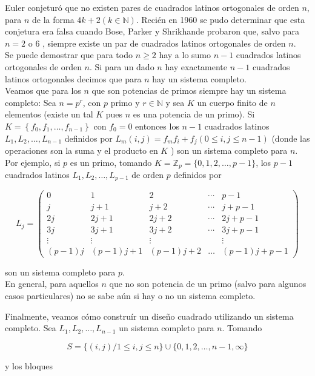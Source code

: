 \documentclass[10pt]{article}
\begin{document}
Euler conjeturó que no existen pares de cuadrados latinos ortogonales de orden $n$, para $n$ de la forma $4 k+2(k \in \mathbb{N})$. Recién en 1960 se pudo determinar que esta conjetura era falsa cuando Bose, Parker y Shrikhande probaron que, salvo para $n=2$ o 6 , siempre existe un par de cuadrados latinos ortogonales de orden $n$.\\
Se puede demostrar que para todo $n \geq 2$ hay a lo sumo $n-1$ cuadrados latinos ortogonales de orden $n$. Si para un dado $n$ hay exactamente $n-1$ cuadrados latinos ortogonales decimos que para $n$ hay un sistema completo.\\
Veamos que para los $n$ que son potencias de primos siempre hay un sistema completo: Sea $n=p^{r}$, con $p$ primo y $r \in \mathbb{N}$ y sea $K$ un cuerpo finito de $n$ elementos (existe un tal $K$ pues $n$ es una potencia de un primo). Si $K=\left\{f_{0}, f_{1}, \ldots, f_{n-1}\right\}$ con $f_{0}=0$ entonces los $n-1$ cuadrados latinos $L_{1}, L_{2}, \ldots, L_{n-1}$ definidos por $L_{m}(i, j)=f_{m} f_{i}+f_{j}(0 \leq i, j \leq n-1)$ (donde las operaciones son la suma y el producto en $K$ ) son un sistema completo para $n$. Por ejemplo, si $p$ es un primo, tomando $K=\mathbb{Z}_{p}=\{0,1,2, \ldots, p-1\}$, los $p-1$ cuadrados latinos $L_{1}, L_{2}, \ldots, L_{p-1}$ de orden $p$ definidos por

$$
L_{j}=\left(\begin{array}{ccccc}
0 & 1 & 2 & \cdots & p-1 \\
j & j+1 & j+2 & \cdots & j+p-1 \\
2 j & 2 j+1 & 2 j+2 & \cdots & 2 j+p-1 \\
3 j & 3 j+1 & 3 j+2 & \cdots & 3 j+p-1 \\
\vdots & \vdots & \vdots & & \vdots \\
(p-1) j & (p-1) j+1 & (p-1) j+2 & \ldots & (p-1) j+p-1
\end{array}\right)
$$

son un sistema completo para $p$.\\
En general, para aquellos $n$ que no son potencia de un primo (salvo para algunos casos particulares) no se sabe aún si hay o no un sistema completo.

Finalmente, veamos cómo construír un diseño cuadrado utilizando un sistema completo. Sea $L_{1}, L_{2}, \ldots, L_{n-1}$ un sistema completo para $n$. Tomando

$$
S=\{(i, j) / 1 \leq i, j \leq n\} \cup\{0,1,2, \ldots, n-1, \infty\}
$$

y los bloques
\end{document}
